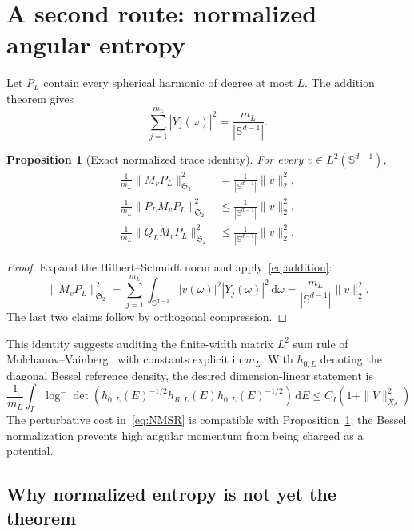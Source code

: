 \documentclass[11pt]{article}
\newcommand{\Sd}{\mathbb S^{d-1}}
\newcommand{\HS}{\mathfrak S_2}
\newcommand{\dd}{\,\mathrm d}
\newtheorem{proposition}[theorem]{Proposition}
\theoremstyle{definition}
\theoremstyle{remark}
\begin{document}
\section{A second route: normalized angular entropy}

Let $P_L$ contain every spherical harmonic of degree at most $L$.  The addition theorem gives
\begin{equation}
 \sum_{j=1}^{m_L}|Y_j(\omega)|^2=\frac{m_L}{|\Sd|}.
 \label{eq:addition}
\end{equation}

\begin{proposition}[Exact normalized trace identity]\label{prop:normalized-cost}
For every $v\in L^2(\Sd)$,
\begin{align}
 \frac1{m_L}\|M_vP_L\|_{\HS}^2
 &=\frac1{|\Sd|}\|v\|_2^2,
 \label{eq:normalized-full-column}\\
 \frac1{m_L}\|P_LM_vP_L\|_{\HS}^2
 &\leq\frac1{|\Sd|}\|v\|_2^2,
 \label{eq:normalized-compression}\\
 \frac1{m_L}\|Q_LM_vP_L\|_{\HS}^2
 &\leq\frac1{|\Sd|}\|v\|_2^2.
 \label{eq:normalized-leakage}
\end{align}
\end{proposition}

\begin{proof}
Expand the Hilbert--Schmidt norm and apply~\eqref{eq:addition}:
\begin{equation}
 \|M_vP_L\|_{\HS}^2
 =\sum_{j=1}^{m_L}\int_{\Sd}|v(\omega)|^2|Y_j(\omega)|^2\dd\omega
 =\frac{m_L}{|\Sd|}\|v\|_2^2.
\end{equation}
The last two claims follow by orthogonal compression.
\end{proof}

This identity suggests auditing the finite-width matrix $L^2$ sum rule of Molchanov--Vainberg~\cite{MolchanovVainberg2004} with constants explicit in $m_L$.  With $h_{0,L}$ denoting the diagonal Bessel reference density, the desired dimension-linear statement is
\begin{equation}
 \frac1{m_L}\int_I
 \log^-\det\!\left(h_{0,L}(E)^{-1/2}h_{R,L}(E)h_{0,L}(E)^{-1/2}\right)\dd E
 \leq C_I\left(1+\|V\|_{X_d}^2\right)
 \label{eq:NMSR}
\end{equation}
The perturbative cost in~\eqref{eq:NMSR} is compatible with Proposition~\ref{prop:normalized-cost}; the Bessel normalization prevents high angular momentum from being charged as a potential.

\subsection{Why normalized entropy is not yet the theorem}
\end{document}
